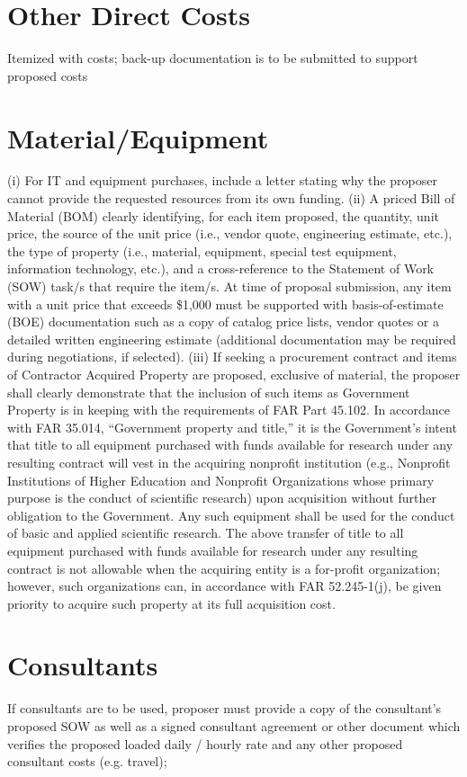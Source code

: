 \section{Other Direct Costs}
Itemized with costs; back-up documentation is to be submitted to support proposed costs
\section{Material/Equipment}
(i) For IT and equipment purchases, include a letter stating why the proposer cannot provide
the requested resources from its own funding.
(ii) A priced Bill of Material (BOM) clearly identifying, for each item proposed, the
quantity, unit price, the source of the unit price (i.e., vendor quote, engineering estimate,
etc.), the type of property (i.e., material, equipment, special test equipment, information
technology, etc.), and a cross-reference to the Statement of Work (SOW) task/s that require
the item/s. At time of proposal submission, any item with a unit price that exceeds \$1,000
must be supported with basis-of-estimate (BOE) documentation such as a copy of catalog
price lists, vendor quotes or a detailed written engineering estimate (additional
documentation may be required during negotiations, if selected).
(iii) If seeking a procurement contract and items of Contractor Acquired Property are
proposed, exclusive of material, the proposer shall clearly demonstrate that the inclusion of
such items as Government Property is in keeping with the requirements of FAR Part 45.102.
In accordance with FAR 35.014, “Government property and title,” it is the Government’s
intent that title to all equipment purchased with funds available for research under any
resulting contract will vest in the acquiring nonprofit institution (e.g., Nonprofit Institutions
of Higher Education and Nonprofit Organizations whose primary purpose is the conduct of
scientific research) upon acquisition without further obligation to the Government. Any such
equipment shall be used for the conduct of basic and applied scientific research. The above
transfer of title to all equipment purchased with funds available for research under any
resulting contract is not allowable when the acquiring entity is a for-profit organization;
however, such organizations can, in accordance with FAR 52.245-1(j), be given priority to
acquire such property at its full acquisition cost.
\section{Consultants}
If consultants are to be used, proposer must provide a copy of the consultant’s proposed
SOW as well as a signed consultant agreement or other document which verifies the
proposed loaded daily / hourly rate and any other proposed consultant costs (e.g. travel);

